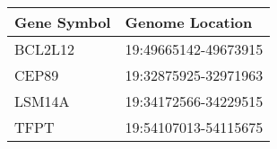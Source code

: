 \begin{tabular}{ll}
\toprule
Gene Symbol &      Genome Location \\
\midrule
    BCL2L12 & 19:49665142-49673915 \\
      CEP89 & 19:32875925-32971963 \\
     LSM14A & 19:34172566-34229515 \\
       TFPT & 19:54107013-54115675 \\
\bottomrule
\end{tabular}
